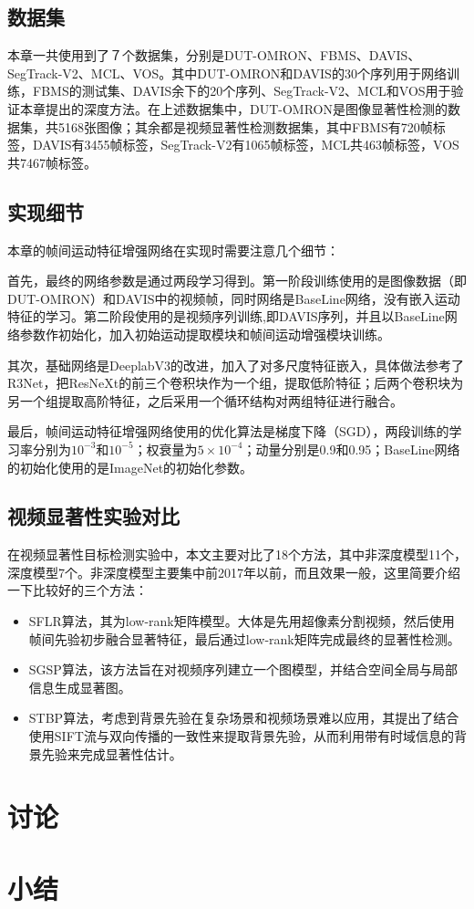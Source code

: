 \subsection{数据集}
本章一共使用到了７个数据集，分别是DUT-OMRON、FBMS、DAVIS、SegTrack-V2、MCL、VOS。其中DUT-OMRON和DAVIS的30个序列用于网络训练，FBMS的测试集、DAVIS余下的20个序列、SegTrack-V2、MCL和VOS用于验证本章提出的深度方法。在上述数据集中，DUT-OMRON是图像显著性检测的数据集，共5168张图像；其余都是视频显著性检测数据集，其中FBMS有720帧标签，DAVIS有3455帧标签，SegTrack-V2有1065帧标签，MCL共463帧标签，VOS共7467帧标签。

\subsection{实现细节}
本章的帧间运动特征增强网络在实现时需要注意几个细节：

首先，最终的网络参数是通过两段学习得到。第一阶段训练使用的是图像数据（即DUT-OMRON）和DAVIS中的视频帧，同时网络是BaseLine网络，没有嵌入运动特征的学习。第二阶段使用的是视频序列训练,即DAVIS序列，并且以BaseLine网络参数作初始化，加入初始运动提取模块和帧间运动增强模块训练。

其次，基础网络是DeeplabV3的改进，加入了对多尺度特征嵌入，具体做法参考了R3Net，把ResNeXt的前三个卷积块作为一个组，提取低阶特征；后两个卷积块为另一个组提取高阶特征，之后采用一个循环结构对两组特征进行融合。

最后，帧间运动特征增强网络使用的优化算法是梯度下降（SGD），两段训练的学习率分别为$10^{-3}$和$10^{-5}$；权衰量为$5 \times 10^{-4}$；动量分别是0.9和0.95；BaseLine网络的初始化使用的是ImageNet的初始化参数。

\subsection{视频显著性实验对比}
在视频显著性目标检测实验中，本文主要对比了18个方法，其中非深度模型11个，深度模型7个。非深度模型主要集中前2017年以前，而且效果一般，这里简要介绍一下比较好的三个方法：

\begin{itemize}
  \item SFLR算法\cite{chen2017video}，其为low-rank矩阵模型。大体是先用超像素分割视频，然后使用帧间先验初步融合显著特征，最后通过low-rank矩阵完成最终的显著性检测。
  \item SGSP算法\cite{liu2016saliency}，该方法旨在对视频序列建立一个图模型，并结合空间全局与局部信息生成显著图。
  \item STBP算法\cite{xi2016salient}，考虑到背景先验在复杂场景和视频场景难以应用，其提出了结合使用SIFT流与双向传播的一致性来提取背景先验，从而利用带有时域信息的背景先验来完成显著性估计。
\end{itemize}


\section{讨论}
\Blindtext

\section{小结}
\Blindtext 